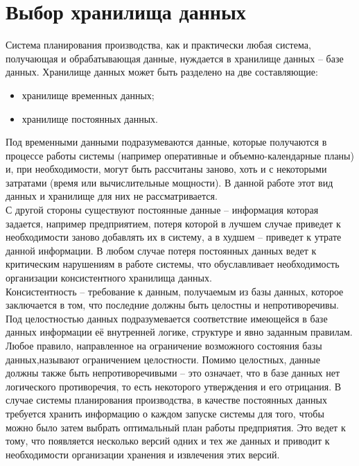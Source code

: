 
\section{Выбор хранилища данных}\label{sec:choose}
\indent Система планирования производства, как и практически любая система, получающая и обрабатывающая данные, нуждается в хранилище данных -- базе данных.
Хранилище данных может быть разделено на две составляющие:
\begin{itemize}
	\item хранилище временных данных;
	\item хранилище постоянных данных.
\end{itemize}

\indent Под временными данными подразумеваются данные, которые получаются в процессе работы системы (например оперативные и объемно-календарные планы) и, при необходимости, могут быть рассчитаны заново, хоть и с некоторыми затратами (время или вычислительные мощности).
В данной работе этот вид данных и хранилище для них не рассматривается.\\
\indent С другой стороны существуют постоянные данные -- информация которая задается, например предприятием, потеря которой в лучшем случае приведет к необходимости заново добавлять их в систему, а в худшем -- приведет к утрате данной информации.
В любом случае потеря постоянных данных ведет к критическим нарушениям в работе системы, что обуславливает необходимость организации консистентного хранилища данных.\\
\indent Консистентность -- требование к данным, получаемым из базы данных, которое заключается в том, что последние должны быть целостны и непротиворечивы.
Под целостностью данных подразумевается соответствие имеющейся в базе данных информации её внутренней логике, структуре и явно заданным правилам.
Любое правило, направленное на ограничение возможного состояния базы данных,называют ограничением целостности.
Помимо целостных, данные должны также быть непротиворечивыми -- это означает, что в базе данных нет логического противоречия, то есть некоторого утверждения и его отрицания.
\indent В случае системы планирования производства, в качестве постоянных данных требуется хранить информацию о каждом запуске системы для того, чтобы можно было затем выбрать оптимальный план работы предприятия.
Это ведет к тому, что появляется несколько версий одних и тех же данных и приводит к необходимости организации хранения и извлечения этих версий.


